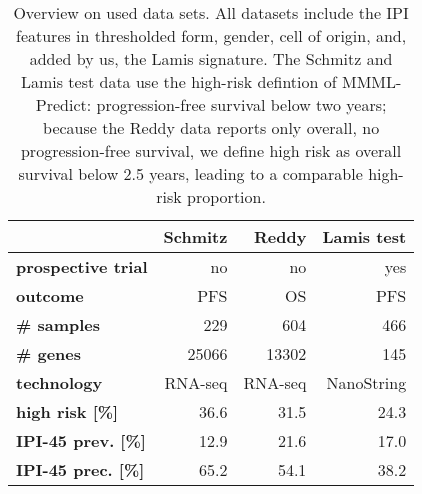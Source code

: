 \begin{table}
    \centering
    \begin{tabular}{lrrr}
        \hline
        & \textbf{Schmitz \cite{schmitz18}} & \textbf{Reddy \cite{reddy17}} & \textbf{Lamis test \cite{staiger20}} \\
        \hline
        \textbf{prospective trial} & no & no & yes \\
        \textbf{outcome} & PFS & OS & PFS \\
        \textbf{\# samples} & \num{229} & \num{604} & \num{466} \\
        \textbf{\# genes} & \num{25066} & \num{13302} & \num{145} \\
        \textbf{technology} & RNA-seq & RNA-seq & NanoString \\
        \textbf{high risk [\%]} & \num{36.6} & \num{31.5}\footnotemark & \num{24.3} \\
        \textbf{IPI-45 prev. [\%]} & \num{12.9} & \num{21.6} & \num{17.0} \\
        \textbf{IPI-45 prec. [\%]} & \num{65.2} & \num{54.1} & \num{38.2} \\
        \hline
    \end{tabular}
    \caption{Overview on used data sets. All datasets include the IPI features in thresholded form, 
        gender, cell of origin, and, added by us, the Lamis signature. The Schmitz and Lamis test 
        data use the high-risk defintion of MMML-Predict: progression-free survival below two years; 
        because the Reddy data reports only overall, no progression-free survival, we define high risk 
        as overall survival below \num{2.5} years, leading to a comparable high-risk proportion.}
        \label{table:data}
\end{table}